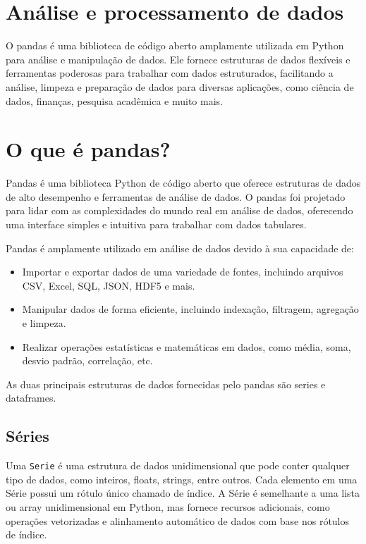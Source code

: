 \documentclass[
  portuguese,
  letterpaper,
  DIV=11,
  numbers=noendperiod]{scrreprt}
\providecommand{\tightlist}{%
  \setlength{\itemsep}{0pt}\setlength{\parskip}{0pt}}
\theoremstyle{definition}
\theoremstyle{remark}
\begin{document}
\section{Análise e processamento de
dados}\label{anuxe1lise-e-processamento-de-dados}

O pandas é uma biblioteca de código aberto amplamente utilizada em
Python para análise e manipulação de dados. Ele fornece estruturas de
dados flexíveis e ferramentas poderosas para trabalhar com dados
estruturados, facilitando a análise, limpeza e preparação de dados para
diversas aplicações, como ciência de dados, finanças, pesquisa acadêmica
e muito mais.

\section{O que é pandas?}\label{o-que-uxe9-pandas}

Pandas é uma biblioteca Python de código aberto que oferece estruturas
de dados de alto desempenho e ferramentas de análise de dados. O pandas
foi projetado para lidar com as complexidades do mundo real em análise
de dados, oferecendo uma interface simples e intuitiva para trabalhar
com dados tabulares.

Pandas é amplamente utilizado em análise de dados devido à sua
capacidade de:

\begin{itemize}
\tightlist
\item
  Importar e exportar dados de uma variedade de fontes, incluindo
  arquivos CSV, Excel, SQL, JSON, HDF5 e mais.
\item
  Manipular dados de forma eficiente, incluindo indexação, filtragem,
  agregação e limpeza.
\item
  Realizar operações estatísticas e matemáticas em dados, como média,
  soma, desvio padrão, correlação, etc.
\end{itemize}

As duas principais estruturas de dados fornecidas pelo pandas são series
e dataframes.

\subsection{Séries}\label{suxe9ries}

Uma \texttt{Serie} é uma estrutura de dados unidimensional que pode
conter qualquer tipo de dados, como inteiros, floats, strings, entre
outros. Cada elemento em uma Série possui um rótulo único chamado de
índice. A Série é semelhante a uma lista ou array unidimensional em
Python, mas fornece recursos adicionais, como operações vetorizadas e
alinhamento automático de dados com base nos rótulos de índice.
\end{document}
